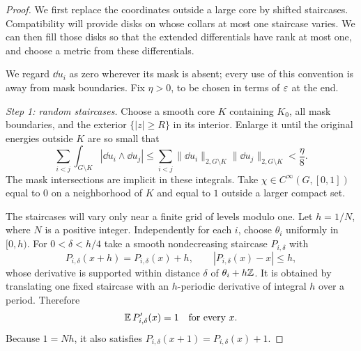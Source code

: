 \begin{proof}
We first replace the coordinates outside a large core by shifted
staircases.  Compatibility will provide disks on whose collars at most
one staircase varies.  We can then fill those disks so that the extended
differentials have rank at most one, and choose a metric from these
differentials.

We regard $\dd u_i$ as zero wherever its mask is absent; every use of
this convention is away from mask boundaries.  Fix $\eta>0$, to be
chosen in terms of $\varepsilon$ at the end.

\smallskip\noindent
\emph{Step 1: random staircases.}
Choose a smooth core $K$ containing $K_0$, all mask boundaries, and the
exterior $\{|z|\ge R\}$ in its interior.  Enlarge it until the original
energies outside $K$ are so small that
\begin{equation}\label{eq:transfer-original-wedges}
 \sum_{i<j}\int_{G\setminus K}
       |\dd u_i\wedge\dd u_j|
 \le \sum_{i<j}
       \|\dd u_i\|_{2,G\setminus K}
       \|\dd u_j\|_{2,G\setminus K}
 <\frac{\eta}{8}.
\end{equation}
The mask intersections are implicit in these integrals.  Take
$\chi\in C^\infty(G,[0,1])$ equal to $0$ on a
neighborhood of $K$ and equal to $1$ outside a larger compact set.

The staircases will vary only near a finite grid of levels modulo one.
Let $h=1/N$, where $N$ is a positive integer.  Independently for each
$i$, choose $\theta_i$ uniformly in $[0,h)$.  For $0<\delta<h/4$ take a
smooth nondecreasing staircase $P_{i,\delta}$ with
\[
 P_{i,\delta}(x+h)=P_{i,\delta}(x)+h,
 \qquad |P_{i,\delta}(x)-x|\le h,
\]
whose derivative is supported within distance $\delta$ of
$\theta_i+h\mathbb Z$.  It is obtained by translating one fixed staircase
with an $h$-periodic derivative of integral $h$ over a period.  Therefore
\begin{equation}\label{eq:transfer-staircase-mean}
 \operatorname{\mathbb E} P_{i,\delta}'(x)=1
 \quad\text{for every }x.
\end{equation}
Because $1=Nh$, it also satisfies
$P_{i,\delta}(x+1)=P_{i,\delta}(x)+1$.


\end{proof}
